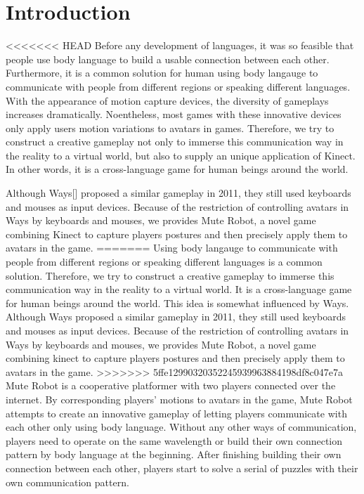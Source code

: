 \documentclass{chi-ext}
\begin{document}
\section{Introduction}
<<<<<<< HEAD
Before any development of languages, it was so feasible that people use body language to build a usable connection between each other.
Furthermore, it is a common solution for human using body langauge to communicate with people from different regions or speaking different languages.
With the appearance of motion capture devices, the diversity of gameplays increases dramatically.
Noentheless, most games with these innovative devices only apply users motion variations to avatars in games.    
Therefore, we try to construct a creative gameplay not only to immerse this communication way in the reality to a virtual world, but also to supply an unique application of Kinect.
In other words, it is a cross-language game for human beings around the world.
 
Although Ways[] proposed a similar gameplay in 2011, they still used keyboards and mouses as input devices.
Because of the restriction of controlling avatars in Ways by keyboards and mouses, we provides Mute Robot, a novel game combining Kinect to capture players postures and then precisely apply them to avatars in the game.
=======
Using body langauge to communicate with people from different regions or speaking different languages is a common solution. 
Therefore, we try to construct a creative gameplay to immerse this communication way in the reality to a virtual world.
It is a cross-language game for human beings around the world. 
This idea is somewhat influenced by Ways\cite{Ways}. Although Ways proposed a similar gameplay in 2011, they still used keyboards and mouses as input devices.
Because of the restriction of controlling avatars in Ways by keyboards and mouses, we provides Mute Robot, a novel game combining kinect to capture players postures and then precisely apply them to avatars in the game.
>>>>>>> 5ffe12990320352245939963884198df8c047e7a
Mute Robot is a cooperative platformer with two players connected over the internet.
By corresponding players' motions to avatars in the game, Mute Robot attempts to create an innovative gameplay of letting players communicate with each other only using body language.
Without any other ways of communication, players need to operate on the same wavelength or build their own connection pattern by body language at the beginning.
After finishing building their own connection between each other, players start to solve a serial of puzzles with their own communication pattern.
\end{document}
